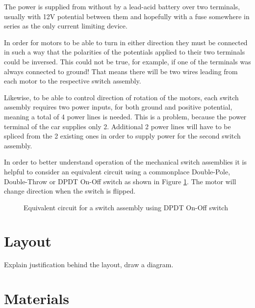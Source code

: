 \documentclass[12pt,letterpaper]{article}
\begin{document}
The power is supplied from without by a lead-acid battery over two terminals, usually with 12\si{\volt} potential between them and hopefully with a fuse somewhere in series as the only current limiting device. 

In order for motors to be able to turn in either direction they must be connected in such a way that the polarities of the potentials applied to their two terminals could be inversed. This could not be true, for example, if one of the terminals was always connected to ground! That means there will be two wires leading from each motor to the respective switch assembly.

Likewise, to be able to control direction of rotation of the motors, each switch assembly requires two power inputs, for both ground and positive potential, meaning a total of 4 power lines is needed. This is a problem, because the power terminal of the car supplies only 2. Additional 2 power lines will have to be spliced from the 2 existing ones in order to supply power for the second switch assembly.

In order to better understand operation of the mechanical switch assemblies it is helpful to consider an equivalent circuit using a commonplace Double-Pole, Double-Throw or DPDT On-Off switch as shown in Figure \ref{fig:motorcontrol}. The motor will change direction when the switch is flipped.
\begin{figure}[h]\label{fig:motorcontrol}
\centering
\def\svgscale{0.4}

\caption{Equivalent circuit for a switch assembly using DPDT On-Off switch}
\end{figure}
\newpage

\section{Layout}
Explain justification behind the layout, draw a diagram.

\section{Materials}
\end{document}
